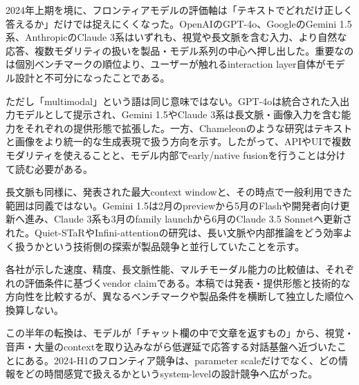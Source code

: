 
2024年上期を境に、フロンティアモデルの評価軸は「テキストでどれだけ正しく答えるか」だけでは捉えにくくなった。OpenAIのGPT-4o、GoogleのGemini 1.5系、AnthropicのClaude 3系はいずれも、視覚や長文脈を含む入力、より自然な応答、複数モダリティの扱いを製品・モデル系列の中心へ押し出した。重要なのは個別ベンチマークの順位より、ユーザーが触れるinteraction layer自体がモデル設計と不可分になったことである。\autocite{src-28ee6f0f00f4,src-2d3a533e91db,src-e91e6f80eaac}


ただし「multimodal」という語は同じ意味ではない。GPT-4oは統合された入出力モデルとして提示され、Gemini 1.5やClaude 3系は長文脈・画像入力を含む能力をそれぞれの提供形態で拡張した。一方、Chameleonのような研究はテキストと画像をより統一的な生成表現で扱う方向を示す。したがって、APIやUIで複数モダリティを使えることと、モデル内部でearly/native fusionを行うことは分けて読む必要がある。\autocite{src-28ee6f0f00f4,src-2d3a533e91db,src-e1259b3c0804,src-e91e6f80eaac}


長文脈も同様に、発表された最大context windowと、その時点で一般利用できた範囲は同義ではない。Gemini 1.5は2月のpreviewから5月のFlashや開発者向け更新へ進み、Claude 3系も3月のfamily launchから6月のClaude 3.5 Sonnetへ更新された。Quiet-STaRやInfini-attentionの研究は、長い文脈や内部推論をどう効率よく扱うかという技術側の探索が製品競争と並行していたことを示す。\autocite{src-12fa04e64d24,src-28ee6f0f00f4,src-2eb2353f0533,src-e91e6f80eaac}


\begin{claimboundary}
各社が示した速度、精度、長文脈性能、マルチモーダル能力の比較値は、それぞれの評価条件に基づくvendor claimである。本稿では発表・提供形態と技術的な方向性を比較するが、異なるベンチマークや製品条件を横断して独立した順位へ換算しない。\autocite{src-06ed597872be,src-28ee6f0f00f4,src-2d3a533e91db,src-a2cf0d0271ac,src-e91e6f80eaac}
\end{claimboundary}

この半年の転換は、モデルが「チャット欄の中で文章を返すもの」から、視覚・音声・大量のcontextを取り込みながら低遅延で応答する対話基盤へ近づいたことにある。2024-H1のフロンティア競争は、parameter scaleだけでなく、どの情報をどの時間感覚で扱えるかというsystem-levelの設計競争へ広がった。\autocite{src-28ee6f0f00f4,src-2d3a533e91db,src-e1259b3c0804,src-e91e6f80eaac}
